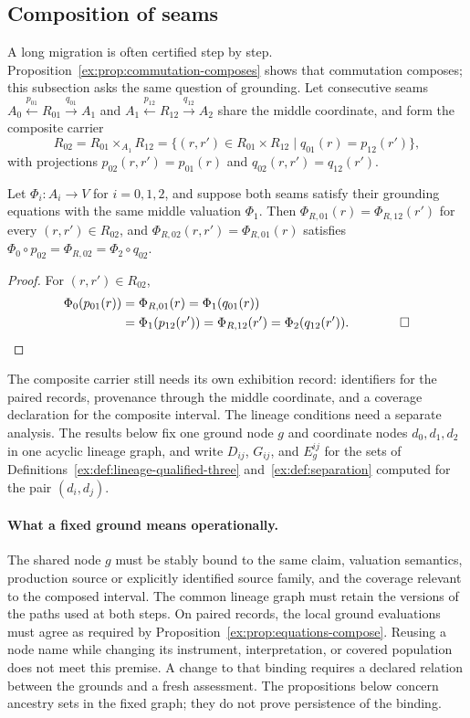\documentclass[smallextended,envcountsect,envcountsame,natbib]{svjour3}
\begin{document}
\subsection{Composition of seams}\label{ex:sec:lineage-composition}

A long migration is often certified step by step. Proposition~\ref{ex:prop:commutation-composes} shows that commutation composes; this subsection asks the same question of grounding. Let consecutive seams $A_0\xleftarrow{p_{01}}R_{01}\xrightarrow{q_{01}}A_1$ and $A_1\xleftarrow{p_{12}}R_{12}\xrightarrow{q_{12}}A_2$ share the middle coordinate, and form the composite carrier
\[
R_{02}=R_{01}\times_{A_1}R_{12}=\{(r,r')\in R_{01}\times R_{12}\mid q_{01}(r)=p_{12}(r')\},
\]
with projections $p_{02}(r,r')=p_{01}(r)$ and $q_{02}(r,r')=q_{12}(r')$.

\begin{proposition}\label{ex:prop:equations-compose}
Let $\Phi_i:A_i\to V$ for $i=0,1,2$, and suppose both seams satisfy their grounding equations with the same middle valuation $\Phi_1$. Then $\Phi_{R,01}(r)=\Phi_{R,12}(r')$ for every $(r,r')\in R_{02}$, and $\Phi_{R,02}(r,r')=\Phi_{R,01}(r)$ satisfies $\Phi_0\circ p_{02}=\Phi_{R,02}=\Phi_2\circ q_{02}$.
\end{proposition}
\begin{proof}
For $(r,r')\in R_{02}$,
\[
\begin{aligned}
\Phi_0(p_{01}(r))&=\Phi_{R,01}(r)=\Phi_1(q_{01}(r))\\
&=\Phi_1(p_{12}(r'))=\Phi_{R,12}(r')=\Phi_2(q_{12}(r')).\qquad\qed
\end{aligned}
\]
\end{proof}

The composite carrier still needs its own exhibition record: identifiers for the paired records, provenance through the middle coordinate, and a coverage declaration for the composite interval. The lineage conditions need a separate analysis. The results below fix one ground node $g$ and coordinate nodes $d_0,d_1,d_2$ in one acyclic lineage graph, and write $D_{ij}$, $G_{ij}$, and $E^{ij}_g$ for the sets of Definitions~\ref{ex:def:lineage-qualified-three} and~\ref{ex:def:separation} computed for the pair $(d_i,d_j)$.

\paragraph{What a fixed ground means operationally.}
The shared node $g$ must be stably bound to the same claim, valuation semantics, production source or explicitly identified source family, and the coverage relevant to the composed interval. The common lineage graph must retain the versions of the paths used at both steps. On paired records, the local ground evaluations must agree as required by Proposition~\ref{ex:prop:equations-compose}. Reusing a node name while changing its instrument, interpretation, or covered population does not meet this premise. A change to that binding requires a declared relation between the grounds and a fresh assessment. The propositions below concern ancestry sets in the fixed graph; they do not prove persistence of the binding.
\end{document}
